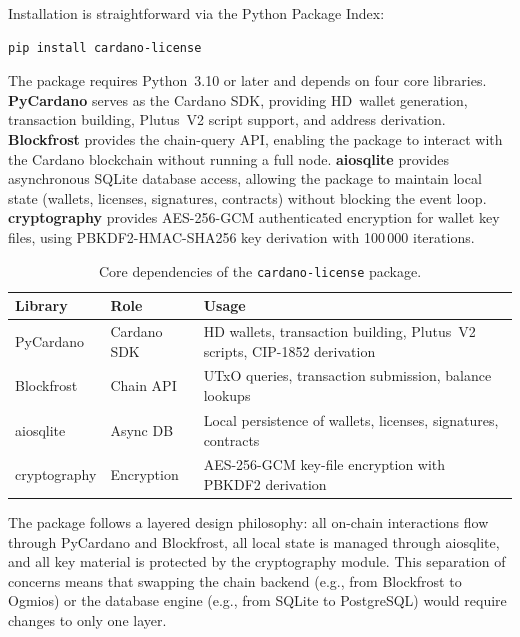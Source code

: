 Installation is straightforward via the Python Package Index:

\begin{lstlisting}[language=bash, caption={Installing cardano-license}]
pip install cardano-license
\end{lstlisting}

The package requires Python~3.10 or later and depends on four core
libraries.  \textbf{PyCardano} serves as the Cardano SDK, providing
HD~wallet generation, transaction building, Plutus~V2 script support, and
address derivation.  \textbf{Blockfrost} provides the chain-query API,
enabling the package to interact with the Cardano blockchain without running
a full node.  \textbf{aiosqlite} provides asynchronous SQLite database
access, allowing the package to maintain local state (wallets, licenses,
signatures, contracts) without blocking the event loop.
\textbf{cryptography} provides AES-256-GCM authenticated encryption for
wallet key files, using PBKDF2-HMAC-SHA256 key derivation with 100\,000
iterations.

\begin{table}[htbp]
\centering
\caption{Core dependencies of the \texttt{cardano-license} package.}
\label{tab:dependencies}
\begin{tabular}{@{}llp{6.5cm}@{}}
\toprule
\textbf{Library} & \textbf{Role} & \textbf{Usage} \\
\midrule
PyCardano        & Cardano SDK   & HD wallets, transaction building, Plutus~V2 scripts, CIP-1852 derivation \\
Blockfrost       & Chain API     & UTxO queries, transaction submission, balance lookups \\
aiosqlite        & Async DB      & Local persistence of wallets, licenses, signatures, contracts \\
cryptography     & Encryption    & AES-256-GCM key-file encryption with PBKDF2 derivation \\
\bottomrule
\end{tabular}
\end{table}

The package follows a layered design philosophy: all on-chain interactions
flow through PyCardano and Blockfrost, all local state is managed through
aiosqlite, and all key material is protected by the cryptography module.
This separation of concerns means that swapping the chain backend (e.g.,
from Blockfrost to Ogmios) or the database engine (e.g., from SQLite to
PostgreSQL) would require changes to only one layer.


